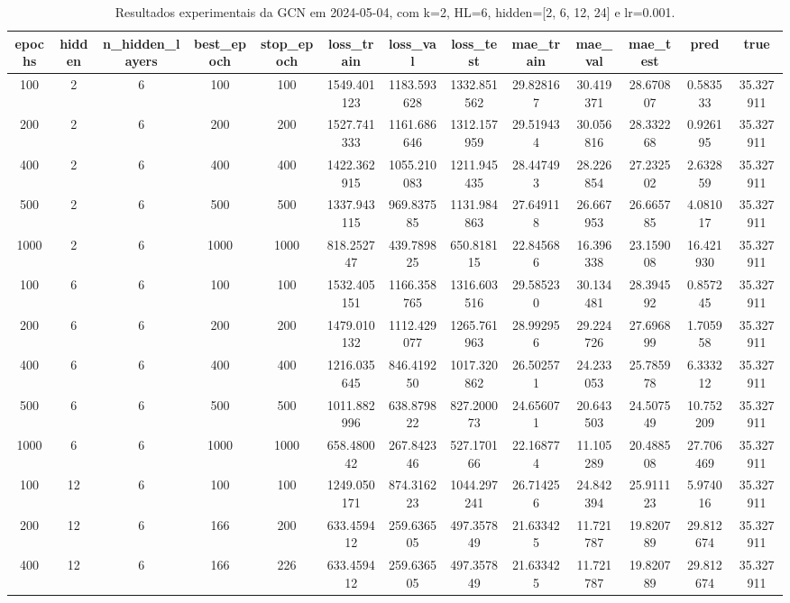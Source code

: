 \begin{table}[h]
\centering
\caption{Resultados experimentais da GCN em 2024-05-04, com k=2, HL=6, hidden=[2, 6, 12, 24] e lr=0.001.}
\label{tab:gcn_results_k2_hl6_d20240504}
\begin{tabular}{ccccccccccccc}
\toprule
epochs & hidden & n\_hidden\_layers & best\_epoch & stop\_epoch & loss\_train & loss\_val & loss\_test & mae\_train & mae\_val & mae\_test & pred & true \\
\midrule
100 & 2 & 6 & 100 & 100 & 1549.401123 & 1183.593628 & 1332.851562 & 29.828167 & 30.419371 & 28.670807 & 0.583533 & 35.327911 \\
200 & 2 & 6 & 200 & 200 & 1527.741333 & 1161.686646 & 1312.157959 & 29.519434 & 30.056816 & 28.332268 & 0.926195 & 35.327911 \\
400 & 2 & 6 & 400 & 400 & 1422.362915 & 1055.210083 & 1211.945435 & 28.447493 & 28.226854 & 27.232502 & 2.632859 & 35.327911 \\
500 & 2 & 6 & 500 & 500 & 1337.943115 & 969.837585 & 1131.984863 & 27.649118 & 26.667953 & 26.665785 & 4.081017 & 35.327911 \\
1000 & 2 & 6 & 1000 & 1000 & 818.252747 & 439.789825 & 650.818115 & 22.845686 & 16.396338 & 23.159008 & 16.421930 & 35.327911 \\
100 & 6 & 6 & 100 & 100 & 1532.405151 & 1166.358765 & 1316.603516 & 29.585230 & 30.134481 & 28.394592 & 0.857245 & 35.327911 \\
200 & 6 & 6 & 200 & 200 & 1479.010132 & 1112.429077 & 1265.761963 & 28.992956 & 29.224726 & 27.696899 & 1.705958 & 35.327911 \\
400 & 6 & 6 & 400 & 400 & 1216.035645 & 846.419250 & 1017.320862 & 26.502571 & 24.233053 & 25.785978 & 6.333212 & 35.327911 \\
500 & 6 & 6 & 500 & 500 & 1011.882996 & 638.879822 & 827.200073 & 24.656071 & 20.643503 & 24.507549 & 10.752209 & 35.327911 \\
1000 & 6 & 6 & 1000 & 1000 & 658.480042 & 267.842346 & 527.170166 & 22.168774 & 11.105289 & 20.488508 & 27.706469 & 35.327911 \\
100 & 12 & 6 & 100 & 100 & 1249.050171 & 874.316223 & 1044.297241 & 26.714256 & 24.842394 & 25.911123 & 5.974016 & 35.327911 \\
200 & 12 & 6 & 166 & 200 & 633.459412 & 259.636505 & 497.357849 & 21.633425 & 11.721787 & 19.820789 & 29.812674 & 35.327911 \\
400 & 12 & 6 & 166 & 226 & 633.459412 & 259.636505 & 497.357849 & 21.633425 & 11.721787 & 19.820789 & 29.812674 & 35.327911 \\

\end{tabular}
\end{table}
